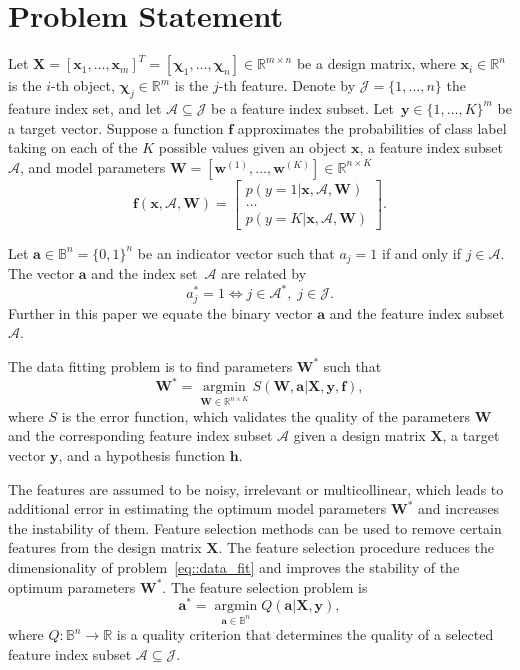 \documentclass[a4paper,12pt]{article}
\theoremstyle{plain} %
\theoremstyle{definition} %
\theoremstyle{remark} %
\newcommand{\bw}{\mathbf{w}}
\newcommand{\bW}{\mathbf{W}}
\newcommand{\bx}{\mathbf{x}}
\newcommand{\bX}{\mathbf{X}}
\newcommand{\by}{\mathbf{y}}
\newcommand{\ba}{\mathbf{a}}
\newcommand{\cA}{\mathcal{A}}
\newcommand{\bchi}{\boldsymbol{\chi}}
\newcommand{\argmin}{\mathop{\arg \min}\limits}
\begin{document}
		
	\section*{Problem Statement}
	
	Let $\bX = [\bx_1, \dots, \bx_m]^T = [\bchi_1, \ldots, \bchi_n] \in \mathbb{R}^{m \times n}$ be a design matrix, where $\bx_i \in \mathbb{R}^n$ is the $i$-th object, $\bchi_j \in \mathbb{R}^m$ is the $j$-th feature.
	Denote by $\mathcal{J} = \{1, \ldots, n \}$ the feature index set, and let $\cA \subseteq \mathcal{J}$ be a feature index subset.
	Let~$\by \in \{1, \dots, K\}^m$ be a target vector.
	Suppose a function $\mathbf{f}$ approximates the probabilities of class label taking on each of the $K$ possible values given an object $\bx$, a feature index subset $\cA$, and model parameters $\bW = \left[\bw^{(1)}, \dots, \bw^{(K)}\right] \in \mathbb{R}^{n \times K}$
	\[
	\mathbf{f}(\bx, \cA, \bW) = 
	\begin{bmatrix}
	p(y=1 | \bx, \cA, \bW) \\
	\dots \\
	p(y=K | \bx, \cA, \bW) 
	\end{bmatrix}.
	\]	
	
	Let $\mathbf{a} \in \mathbb{B}^n = \{0,1\}^n$ be an indicator vector such that $a_j = 1$ if and only if $j \in \cA$.
	The vector $\mathbf{a}$ and the index set~$\cA$ are related by
	\begin{equation}
	a^*_j = 1 \Leftrightarrow j \in \mathcal{A}^*, \; j \in \mathcal{J}.
	\label{eq::vec2set}
	\end{equation}
	Further in this paper we equate the binary vector $\mathbf{a}$ and the feature index subset $\cA$.
	
	The data fitting problem is to find parameters $\bW^*$ such that
	\begin{equation}
		\bW^* = \argmin_{\bW \in \mathbb{R}^{n \times K}} S\left(\bW, \ba | \bX, \by, \mathbf{f}\right),
		\label{eq::data_fit}
	\end{equation}
	where $S$ is the error function, which validates the quality of the parameters $\bW$ and the corresponding feature index subset $\cA$ given a design matrix $\bX$, a target vector $\by$, and a hypothesis function $\mathbf{h}$.
	
	The features are assumed to be noisy, irrelevant or multicollinear, which leads to  additional error in estimating the optimum model parameters $\bW^*$ and increases the instability of them.
	Feature selection methods can be used to remove certain features from the design matrix $\bX$.
	The feature selection procedure reduces the dimensionality of problem~\eqref{eq::data_fit} and improves the stability of the optimum parameters $\bW^*$.
	The feature selection problem is
	\begin{equation}
	\ba^* = \argmin_{\ba \in \mathbb{B}^n} Q(\ba|\bX, \by),
	\label{eq::feat_sel}
	\end{equation}
	where $Q: \mathbb{B}^n \rightarrow \mathbb{R}$ is a quality criterion that determines the quality of a selected feature index subset $\cA \subseteq \mathcal{J}$. 
	
\end{document}
